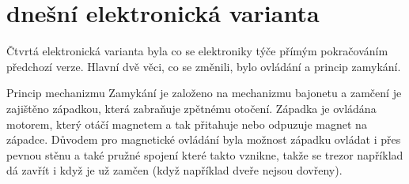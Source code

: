 \section*{dnešní elektronická varianta}

Čtvrtá elektronická varianta byla co se elektroniky týče přímým pokračováním předchozí verze. 
Hlavní dvě věci, co se změnili, bylo ovládání a princip zamykání. 

Princip mechanizmu
Zamykání je založeno na mechanizmu bajonetu a zamčení je zajištěno západkou, která zabraňuje zpětnému otočení.
Západka je ovládána motorem, který otáčí magnetem a tak přitahuje nebo odpuzuje magnet na západce. Důvodem pro magnetické ovládání
byla možnost západku ovládat i přes pevnou stěnu a také pružné spojení které takto vznikne, takže se trezor například dá zavřít i když
je už zamčen (když například dveře nejsou dovřeny).

